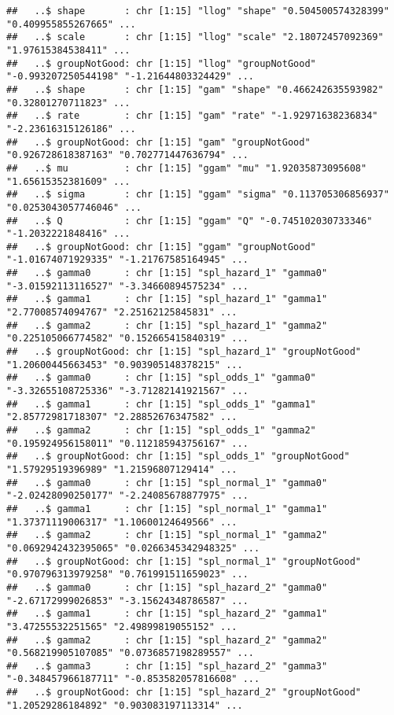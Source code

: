 \documentclass[
]{article}
\begin{document}
\begin{verbatim}
##   ..$ shape       : chr [1:15] "llog" "shape" "0.504500574328399" "0.409955855267665" ...
##   ..$ scale       : chr [1:15] "llog" "scale" "2.18072457092369" "1.97615384538411" ...
##   ..$ groupNotGood: chr [1:15] "llog" "groupNotGood" "-0.993207250544198" "-1.21644803324429" ...
##   ..$ shape       : chr [1:15] "gam" "shape" "0.466242635593982" "0.32801270711823" ...
##   ..$ rate        : chr [1:15] "gam" "rate" "-1.92971638236834" "-2.23616315126186" ...
##   ..$ groupNotGood: chr [1:15] "gam" "groupNotGood" "0.926728618387163" "0.702771447636794" ...
##   ..$ mu          : chr [1:15] "ggam" "mu" "1.92035873095608" "1.65615352381609" ...
##   ..$ sigma       : chr [1:15] "ggam" "sigma" "0.113705306856937" "0.0253043057746046" ...
##   ..$ Q           : chr [1:15] "ggam" "Q" "-0.745102030733346" "-1.2032221848416" ...
##   ..$ groupNotGood: chr [1:15] "ggam" "groupNotGood" "-1.01674071929335" "-1.21767585164945" ...
##   ..$ gamma0      : chr [1:15] "spl_hazard_1" "gamma0" "-3.01592113116527" "-3.34660894575234" ...
##   ..$ gamma1      : chr [1:15] "spl_hazard_1" "gamma1" "2.77008574094767" "2.25162125845831" ...
##   ..$ gamma2      : chr [1:15] "spl_hazard_1" "gamma2" "0.225105066774582" "0.152665415840319" ...
##   ..$ groupNotGood: chr [1:15] "spl_hazard_1" "groupNotGood" "1.20600445663453" "0.903905148378215" ...
##   ..$ gamma0      : chr [1:15] "spl_odds_1" "gamma0" "-3.32655108725336" "-3.71282141921567" ...
##   ..$ gamma1      : chr [1:15] "spl_odds_1" "gamma1" "2.85772981718307" "2.28852676347582" ...
##   ..$ gamma2      : chr [1:15] "spl_odds_1" "gamma2" "0.195924956158011" "0.112185943756167" ...
##   ..$ groupNotGood: chr [1:15] "spl_odds_1" "groupNotGood" "1.57929519396989" "1.21596807129414" ...
##   ..$ gamma0      : chr [1:15] "spl_normal_1" "gamma0" "-2.02428090250177" "-2.24085678877975" ...
##   ..$ gamma1      : chr [1:15] "spl_normal_1" "gamma1" "1.37371119006317" "1.10600124649566" ...
##   ..$ gamma2      : chr [1:15] "spl_normal_1" "gamma2" "0.0692942432395065" "0.0266345342948325" ...
##   ..$ groupNotGood: chr [1:15] "spl_normal_1" "groupNotGood" "0.970796313979258" "0.761991511659023" ...
##   ..$ gamma0      : chr [1:15] "spl_hazard_2" "gamma0" "-2.67172999026853" "-3.15624348786587" ...
##   ..$ gamma1      : chr [1:15] "spl_hazard_2" "gamma1" "3.47255532251565" "2.49899819055152" ...
##   ..$ gamma2      : chr [1:15] "spl_hazard_2" "gamma2" "0.568219905107085" "0.0736857198289557" ...
##   ..$ gamma3      : chr [1:15] "spl_hazard_2" "gamma3" "-0.348457966187711" "-0.853582057816608" ...
##   ..$ groupNotGood: chr [1:15] "spl_hazard_2" "groupNotGood" "1.20529286184892" "0.903083197113314" ...

\end{verbatim}
\end{document}
